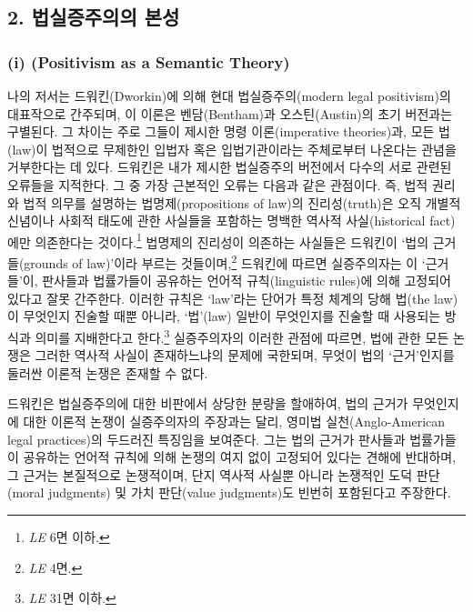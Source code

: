 \subsection{2. 법실증주의의
본성}\label{uxbc95uxc2e4uxc99duxc8fcuxc758uxc758-uxbcf8uxc131}

\subsubsection{\texorpdfstring{(i) (Positivism as a Semantic
Theory)}{(i) 의미론적 이론으로서의 실증주의(Positivism as a Semantic Theory)}}\label{i-uxc758uxbbf8uxb860uxc801-uxc774uxb860uxc73cuxb85cuxc11cuxc758-uxc2e4uxc99duxc8fcuxc758positivism-as-a-semantic-theory}

나의 저서는 드워킨(Dworkin)에 의해 현대 법실증주의(modern legal
positivism)의 대표작으로 간주되며, 이 이론은 벤담(Bentham)과
오스틴(Austin)의 초기 버전과는 구별된다. 그 차이는 주로 그들이 제시한
명령 이론(imperative theories)과, 모든 법(law)이 법적으로 무제한인
입법자 혹은 입법기관이라는 주체로부터 나온다는 관념을 거부한다는 데
있다. 드워킨은 내가 제시한 법실증주의 버전에서 다수의 서로 관련된
오류들을 지적한다. 그 중 가장 근본적인 오류는 다음과 같은 관점이다. 즉,
법적 권리와 법적 의무를 설명하는 법명제(propositions of law)의
진리성(truth)은 오직 개별적 신념이나 사회적 태도에 관한 사실들을
포함하는 명백한 역사적 사실(historical fact)에만 의존한다는
것이다.\footnote{\emph{LE} 6면 이하.} 법명제의 진리성이 의존하는
사실들은 드워킨이 `법의 근거들(grounds of law)'이라 부르는
것들이며,\footnote{\emph{LE} 4면.} 드워킨에 따르면 실증주의자는 이
`근거들'이, 판사들과 법률가들이 공유하는 언어적 규칙(linguistic rules)에
의해 고정되어 있다고 잘못 간주한다. 이러한 규칙은 `law'라는 단어가 특정
체계의 당해 법(the law)이 무엇인지 진술할 때뿐 아니라, `법'(law) 일반이
무엇인지를 진술할 때 사용되는 방식과 의미를 지배한다고 한다.\footnote{\emph{LE}
  31면 이하.} 실증주의자의 이러한 관점에 따르면, 법에 관한 모든 논쟁은
그러한 역사적 사실이 존재하느냐의 문제에 국한되며, 무엇이 법의
`근거'인지를 둘러싼 이론적 논쟁은 존재할 수 없다.

드워킨은 법실증주의에 대한 비판에서 상당한 분량을 할애하여, 법의 근거가
무엇인지에 대한 이론적 논쟁이 실증주의자의 주장과는 달리, 영미법
실천(Anglo-American legal practices)의 두드러진 특징임을 보여준다. 그는
법의 근거가 판사들과 법률가들이 공유하는 언어적 규칙에 의해 논쟁의 여지
없이 고정되어 있다는 견해에 반대하며, 그 근거는 본질적으로 논쟁적이며,
단지 역사적 사실뿐 아니라 논쟁적인 도덕 판단(moral judgments) 및 가치
판단(value judgments)도 빈번히 포함된다고 주장한다.

